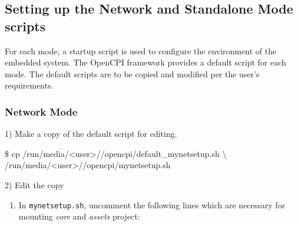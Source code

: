 \begin{flushleft}

\subsection{Setting up the Network and Standalone Mode scripts}

For each mode, a startup script is used to configure the environment of the embedded system. The OpenCPI framework provides a default script for each mode. The default scripts are to be copied and modified per the user's requirements.\par\medskip

\subsubsection{Network Mode}
1) Make a copy of the default script for editing. \\ \medskip
\begin{texttt}
\$ cp /run/media/<user>/\copyLoc/opencpi/default\_mynetsetup.sh \textbackslash\\
/run/media/<user>/\copyLoc/opencpi/mynetsetup.sh
\end{texttt}\medskip

2) Edit the copy
\begin{enumerate}
\item In \texttt{mynetsetup.sh}, uncomment the following lines which are necessary for mounting \textit{core} and \textit{assets} project: \\ \medskip


\end{enumerate}
\end{flushleft}
